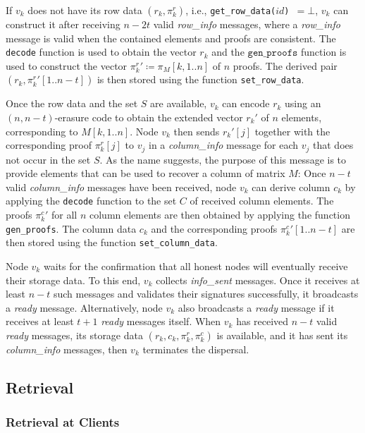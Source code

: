 \documentclass[sigconf,screen]{acmart}
\begin{document}
If $v_k$ does not have its row data $(r_k, \pi_k^r)$, i.e., \texttt{get\_row\_data($id$) $= \bot$}, $v_k$
can construct it after receiving $n-2t$ valid \emph{row\_info} messages, where a \emph{row\_info} message is valid when the contained elements and proofs are consistent. The \texttt{decode} function is used to obtain the vector $r_k$ and the $\texttt{gen\_proofs}$ function is used to construct the vector ${\pi_k^r}' \coloneqq \pi_M[k,1..n]$ of $n$ proofs. The derived pair $(r_k, {\pi_k^r}'[1..n-t])$ is then stored using the function \texttt{set\_row\_data}.

Once the row data and the set $S$ are available, $v_k$ can encode $r_k$ using an $(n, n-t)$-erasure code to obtain the extended vector $r_k'$ of $n$ elements, corresponding to $M[k, 1..n]$. Node $v_k$ then sends $r_k'[j]$ together with the corresponding proof $\pi_k^r[j]$ to $v_j$ in a \emph{column\_info} message for each $v_j$ that does not occur in the set $S$.
As the name suggests, the purpose of this message is to provide elements that can be used to recover a column of matrix $M$: Once $n-t$ valid \emph{column\_info} messages have been received, node $v_k$ can derive column $c_k$ by applying the \texttt{decode} function to the set $C$ of received column elements. The proofs ${\pi_k^c}'$ for all $n$ column elements are then obtained by applying the function \texttt{gen\_proofs}. The column data $c_k$ and the corresponding proofs ${\pi_k^c}'[1..n-t]$ are then stored using the function \texttt{set\_column\_data}.

Node $v_k$ waits for the confirmation that all honest nodes will eventually receive their storage data. To this end, $v_k$ collects \emph{info\_sent} messages. Once it receives at least $n-t$ such messages and validates their signatures successfully, it broadcasts a \emph{ready} message. Alternatively, node $v_k$ also broadcasts a \emph{ready} message if it receives at least $t+1$ \emph{ready} messages itself.
When $v_k$ has received $n-t$ valid \emph{ready} messages, its storage data $(r_k, c_k, \pi_k^r, \pi_k^c)$ is available, and it has sent its \emph{column\_info} messages, then $v_k$ terminates the dispersal.

\subsection{Retrieval}

\subsubsection{Retrieval at Clients}
\end{document}
